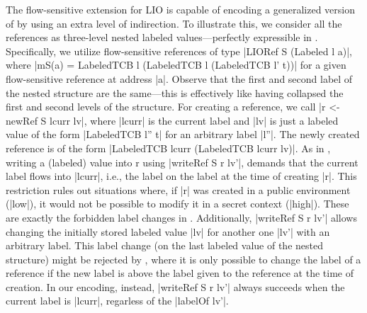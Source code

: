 The flow-sensitive extension for LIO is capable of encoding a generalized version
of {\nsu} by using an extra level of indirection.  To illustrate this, we
consider all the references as three-level nested labeled values---perfectly
expressible in \liofs{}. Specifically, we utilize flow-sensitive references of
type |LIORef S (Labeled l a)|, where |mS(a) = LabeledTCB l (LabeledTCB l
(LabeledTCB l' t))| for a given flow-sensitive reference at address |a|. Observe
that the first and second label of the nested structure are the same---this is
effectively like having collapsed the first and second levels of the structure. For
creating a reference, we call |r <- newRef S lcurr lv|, where |lcurr| is the
current label and |lv| is just a labeled value of the form |LabeledTCB l'' t|
for an arbitrary label |l''|.  The newly created reference is of the form
|LabeledTCB lcurr (LabeledTCB lcurr lv)|.  As in {\nsu}, writing a (labeled)
value into r using |writeRef S r lv'|, demands that the current label flows into
|lcurr|, i.e., the label on the label at the time of creating |r|. This
restriction rules out situations where, if |r| was created in a public
environment (|low|), it would not be possible to modify it in a secret context
(|high|). These are exactly the forbidden label changes in {\nsu}. Additionally,
|writeRef S r lv'| allows changing the initially stored labeled value |lv| for
another one |lv'| with an arbitrary label. This label change (on the last
labeled value of the nested structure) might be rejected by {\nsu}, where it is
only possible to change the label of a reference if the new label is 
above the label given to the reference at the time of creation. In our encoding,
instead, |writeRef S r lv'| always succeeds when the current label is
|lcurr|, regarless of the |labelOf lv'|. 


